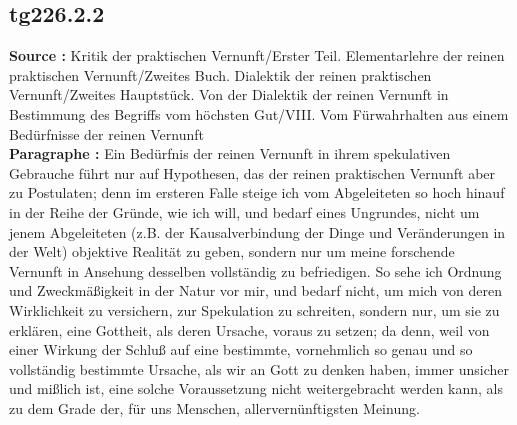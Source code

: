 \documentclass[a4paper,12pt,twoside]{book}
\begin{document}
	\subsection*{tg226.2.2} 
	\textbf{Source : }Kritik der praktischen Vernunft/Erster Teil. Elementarlehre der reinen praktischen Vernunft/Zweites Buch. Dialektik der reinen praktischen Vernunft/Zweites Hauptstück. Von der Dialektik der reinen Vernunft in Bestimmung des Begriffs vom höchsten Gut/VIII. Vom Fürwahrhalten aus einem Bedürfnisse der reinen Vernunft\\  
	
	\noindent\textbf{Paragraphe : }Ein Bedürfnis der reinen Vernunft in ihrem spekulativen Gebrauche führt nur auf Hypothesen, das der reinen praktischen Vernunft aber zu Postulaten; denn im ersteren Falle steige ich vom Abgeleiteten so hoch hinauf in der Reihe der Gründe, wie ich will, und bedarf eines Ungrundes, nicht um jenem Abgeleiteten (z.B. der Kausalverbindung der Dinge und Veränderungen in der Welt) objektive Realität zu geben, sondern nur um meine forschende Vernunft in Ansehung desselben vollständig zu befriedigen. So sehe ich Ordnung und Zweckmäßigkeit in der Natur vor mir, und bedarf nicht, um mich von deren Wirklichkeit zu versichern, zur Spekulation zu schreiten, sondern nur, um sie zu erklären, eine Gottheit, als deren Ursache, voraus zu setzen; da denn, weil von einer Wirkung der Schluß auf eine bestimmte, vornehmlich so genau und so vollständig bestimmte Ursache, als wir an Gott zu denken haben, immer unsicher und mißlich ist, eine solche Voraussetzung nicht weitergebracht werden kann, als zu dem Grade der, für uns Menschen, allervernünftigsten Meinung.
	
\end{document}
